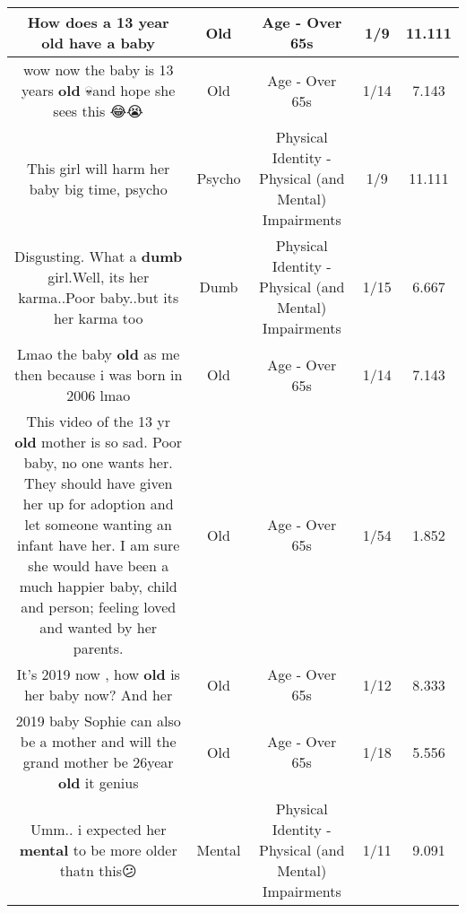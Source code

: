 \documentclass[11pt]{article}
\newlength\mylength
\begin{document}
\begin{center}
\begin{longtable}{|C{.65\mylength}|C{.30\mylength}|C{.12\mylength}|C{.12\mylength}|C{.12\mylength}|}
  \small How does a 13 year \textbf{old} have a baby\normalsize   & Old & Age - Over 65s & 1/9 & 11.111 \\  \hline
  \small wow now the baby is 13 years \textbf{old} 💀and hope she sees this 😂😭\normalsize   & Old & Age - Over 65s & 1/14 & 7.143 \\  \hline
  \small This girl will harm her baby big time, psycho\normalsize   & Psycho & Physical Identity - Physical (and Mental) Impairments & 1/9 & 11.111 \\  \hline
  \small Disgusting. What a \textbf{dumb} girl.Well, its her karma..Poor baby..but its her karma too\normalsize   & Dumb & Physical Identity - Physical (and Mental) Impairments & 1/15 & 6.667 \\  \hline
  \small Lmao the baby \textbf{old} as me then because i was born in 2006 lmao\normalsize   & Old & Age - Over 65s & 1/14 & 7.143 \\  \hline
  \small This video of the 13 yr \textbf{old} mother is so sad. Poor baby, no one wants her. They should have given her up for adoption and let someone wanting an infant have her. I am sure she would have been a much happier baby, child and person; feeling loved and wanted by her parents.\normalsize   & Old & Age - Over 65s & 1/54 & 1.852 \\  \hline
  \small It's 2019 now , how \textbf{old} is her baby now? And her\normalsize   & Old & Age - Over 65s & 1/12 & 8.333 \\  \hline
  \small 2019 baby Sophie can also be a mother and will the grand mother be 26year \textbf{old} it genius\normalsize   & Old & Age - Over 65s & 1/18 & 5.556 \\  \hline
  \small Umm.. i expected her \textbf{mental} to be more older thatn this😕\normalsize   & Mental & Physical Identity - Physical (and Mental) Impairments & 1/11 & 9.091 \\  \hline

\end{longtable}
\end{center}
\end{document}
